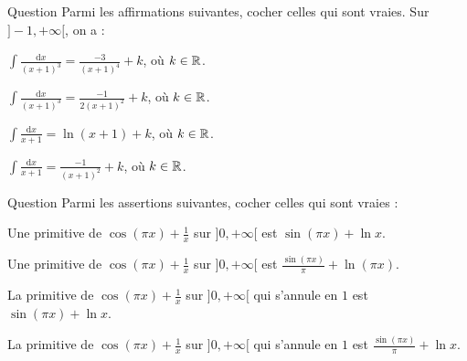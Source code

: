 \begin{multi}[multiple,feedback=
{Avec \(u=1+x\), on a : \(\mathrm{d}u=\mathrm{d}x\),
\[\int \frac{\mathrm{d}x}{(x+1)^3}=\int u^{-3}\mathrm{d}u=\frac{-1}{2}u^{-2}+k=\frac{-1}{2(x+1)^2}+k,\; k\in \Rr,\]
et \(\displaystyle \int \frac{\mathrm{d}x}{x+1}=\int \frac{\mathrm{d}u}{u}=\ln |u|+k=\ln (x+1)+k\), \(k\in \Rr\).
}]{Question}
Parmi les affirmations suivantes, cocher celles qui sont vraies. Sur \(]-1,+\infty[\), on a :

    \item \(\displaystyle \int \frac{\mathrm{d}x}{(x+1)^3}=\frac{-3}{(x+1)^4}+k\), où \(k\in \Rr\).
    \item* \(\displaystyle \int \frac{\mathrm{d}x}{(x+1)^3}=\frac{-1}{2(x+1)^2}+k\), où \(k\in \Rr\).
    \item* \(\displaystyle \int \frac{\mathrm{d}x}{x+1}=\ln (x+1)+k\), où \(k\in \Rr\).
    \item \(\displaystyle \int \frac{\mathrm{d}x}{x+1}=\frac{-1}{(x+1)^2}+k\), où \(k\in \Rr\).
\end{multi}


\begin{multi}{Question}
Parmi les assertions suivantes, cocher celles qui sont vraies :

    \item Une primitive de \(\displaystyle \cos (\pi x)+\frac{1}{x}\) sur \(]0,+\infty[\) est \(\displaystyle \sin (\pi x)+\ln x\).
    \item* Une primitive de \(\displaystyle \cos (\pi x)+\frac{1}{x}\) sur \(]0,+\infty[\) est \(\displaystyle \frac{\sin (\pi x)}{\pi}+\ln (\pi x)\).
    \item La primitive de \(\displaystyle \cos (\pi x)+\frac{1}{x}\) sur \(]0,+\infty[\) qui s'annule en \(1\) est \(\displaystyle \sin (\pi x)+\ln x\).
    \item* La primitive de \(\displaystyle \cos (\pi x)+\frac{1}{x}\) sur \(]0,+\infty[\) qui s'annule en \(1\) est \(\displaystyle \frac{\sin (\pi x)}{\pi}+\ln x\).
\end{multi}


